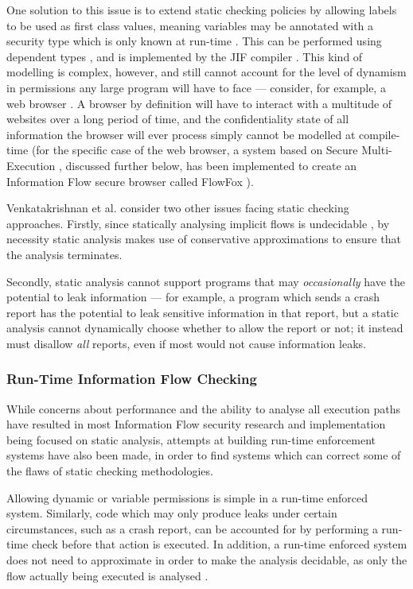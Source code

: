 One solution to this issue is to extend static checking policies by allowing labels to be used as first class values, meaning variables may be annotated with a security type which is only known at run-time \cite{myers1997if}. This can be performed using dependent types \cite{xi1999dependenttypes}, and is implemented by the JIF compiler \cite{myers1999jif}. This kind of modelling is complex, however, and still cannot account for the level of dynamism in permissions any large program will have to face --- consider, for example, a web browser \cite{venkatakrishnan2006runtime}. A browser by definition will have to interact with a multitude of websites over a long period of time, and the confidentiality state of all information the browser will ever process simply cannot be modelled at compile-time (for the specific case of the web browser, a system based on Secure Multi-Execution \cite{devriese2010sme}, discussed further below, has been implemented to create an Information Flow secure browser called FlowFox \cite{degroef2012flowfox}).

Venkatakrishnan et al. \cite{venkatakrishnan2006runtime} consider two other issues facing static checking approaches. Firstly, since statically analysing implicit flows is undecidable \cite{landi1992undecidability}, by necessity static analysis makes use of conservative approximations to ensure that the analysis terminates.

Secondly, static analysis cannot support programs that may \textit{occasionally} have the potential to leak information \cite{venkatakrishnan2006runtime} --- for example, a program which sends a crash report has the potential to leak sensitive information in that report, but a static analysis cannot dynamically choose whether to allow the report or not; it instead must disallow \textit{all} reports, even if most would not cause information leaks.

\subsubsection{Run-Time Information Flow Checking}

While concerns about performance and the ability to analyse all execution paths have resulted in most Information Flow security research and implementation being focused on static analysis, attempts at building run-time enforcement systems have also been made, in order to find systems which can correct some of the flaws of static checking methodologies.

Allowing dynamic or variable permissions is simple in a run-time enforced system. Similarly, code which may only produce leaks under certain circumstances, such as a crash report, can be accounted for by performing a run-time check before that action is executed. In addition, a run-time enforced system does not need to approximate in order to make the analysis decidable, as only the flow actually being executed is analysed \cite{venkatakrishnan2006runtime}.

